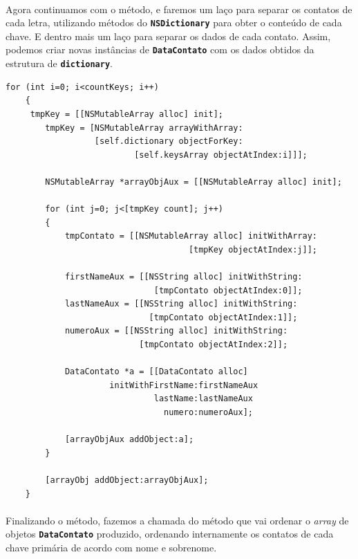 \documentclass[a4paper,12pt,brazil,doubleside]{book}
\begin{document}
\paragraph{}Agora continuamos com o método, e faremos um laço para separar os contatos de cada letra, utilizando métodos do \texttt{\textbf{NSDictionary}} para obter o conteúdo de cada chave. E dentro mais um laço para separar os dados de cada contato. Assim, podemos criar novas instâncias de \texttt{\textbf{DataContato}} com os dados obtidos da estrutura de \texttt{\textbf{dictionary}}.

\begin{listing}
\begin{verbatim}
for (int i=0; i<countKeys; i++)
    {
	 tmpKey = [[NSMutableArray alloc] init];
        tmpKey = [NSMutableArray arrayWithArray:
                  [self.dictionary objectForKey:
                          [self.keysArray objectAtIndex:i]]];
        
        NSMutableArray *arrayObjAux = [[NSMutableArray alloc] init];
        
        for (int j=0; j<[tmpKey count]; j++)
        {
            tmpContato = [[NSMutableArray alloc] initWithArray:
                                     [tmpKey objectAtIndex:j]];

            firstNameAux = [[NSString alloc] initWithString:
                              [tmpContato objectAtIndex:0]];
            lastNameAux = [[NSString alloc] initWithString:
                             [tmpContato objectAtIndex:1]];
            numeroAux = [[NSString alloc] initWithString:
                           [tmpContato objectAtIndex:2]];
            
            DataContato *a = [[DataContato alloc] 
                     initWithFirstName:firstNameAux
                              lastName:lastNameAux
                                numero:numeroAux];
            
            [arrayObjAux addObject:a];            
        }
        
        [arrayObj addObject:arrayObjAux];
    }
\end{verbatim}
\end{listing}

\pagebreak

\paragraph{}Finalizando o método, fazemos a chamada do método que vai ordenar o \emph{array} de objetos \texttt{\textbf{DataContato}} produzido, ordenando internamente os contatos de cada chave primária de acordo com nome e sobrenome.
\end{document}
